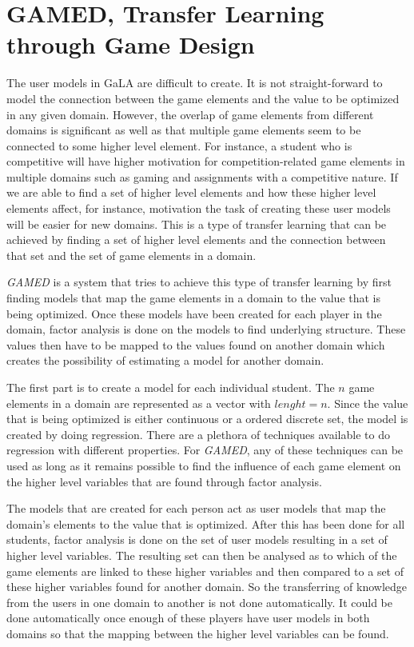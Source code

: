 \documentclass[11pt]{article}
\begin{document}
\section{GAMED, Transfer Learning through Game Design}\label{sec:gamed}
The user models in GaLA are difficult to create. It is not straight-forward to model the connection between the game elements and the value to be optimized in any given domain. However, the overlap of game elements from different domains is significant as well as that multiple game elements seem to be connected to some higher level element. For instance, a student who is competitive will have higher motivation for competition-related game elements in multiple domains such as gaming and assignments with a competitive nature. If we are able to find a set of higher level elements and how these higher level elements affect, for instance, motivation the task of creating these user models will be easier for new domains. This is a type of transfer learning that can be achieved by finding a set of higher level elements and the connection between that set and the set of game elements in a domain. 

\emph{GAMED} is a system that tries to achieve this type of transfer learning by first finding models that map the game elements in a domain to the value that is being optimized. Once these models have been created for each player in the domain, factor analysis is done on the models to find underlying structure. These values then have to be mapped to the values found on another domain which creates the possibility of estimating a model for another domain.

The first part is to create a model for each individual student. The $n$ game elements in a domain are represented as a vector with $lenght=n$. Since the value that is being optimized is either continuous or a ordered discrete set, the model is created by doing regression. There are a plethora of techniques available to do regression with different properties. For \emph{GAMED}, any of these techniques can be used as long as it remains possible to find the influence of each game element on the higher level variables that are found through factor analysis. 

The models that are created for each person act as user models that map the domain's elements to the value that is optimized. After this has been done for all students, factor analysis is done on the set of user models resulting in a set of higher level variables. The resulting set can then be analysed as to which of the game elements are linked to these higher variables and then compared to a set of these higher variables found for another domain. So the transferring of knowledge from the users in one domain to another is not done automatically. It could be done automatically once enough of these players have user models in both domains so that the mapping between the higher level variables can be found.
\end{document}
